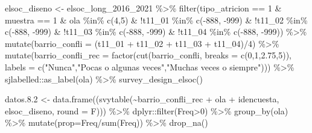 \documentclass[
  12pt,
]{book}
\newenvironment{Shaded}{\begin{snugshade}}{\end{snugshade}}
\newcommand{\AttributeTok}[1]{\textcolor[rgb]{0.77,0.63,0.00}{#1}}
\newcommand{\DecValTok}[1]{\textcolor[rgb]{0.00,0.00,0.81}{#1}}
\newcommand{\FloatTok}[1]{\textcolor[rgb]{0.00,0.00,0.81}{#1}}
\newcommand{\FunctionTok}[1]{\textcolor[rgb]{0.00,0.00,0.00}{#1}}
\newcommand{\NormalTok}[1]{#1}
\newcommand{\OtherTok}[1]{\textcolor[rgb]{0.56,0.35,0.01}{#1}}
\newcommand{\SpecialCharTok}[1]{\textcolor[rgb]{0.00,0.00,0.00}{#1}}
\newcommand{\StringTok}[1]{\textcolor[rgb]{0.31,0.60,0.02}{#1}}
\begin{document}
\begin{Shaded}
\begin{Highlighting}[]
\NormalTok{elsoc\_diseno }\OtherTok{\textless{}{-}}\NormalTok{ elsoc\_long\_2016\_2021 }\SpecialCharTok{\%\textgreater{}\%} 
  \FunctionTok{filter}\NormalTok{(tipo\_atricion }\SpecialCharTok{==} \DecValTok{1} \SpecialCharTok{\&}\NormalTok{ muestra }\SpecialCharTok{==} \DecValTok{1} \SpecialCharTok{\&}\NormalTok{ ola }\SpecialCharTok{\%in\%} \FunctionTok{c}\NormalTok{(}\DecValTok{4}\NormalTok{,}\DecValTok{5}\NormalTok{) }\SpecialCharTok{\&} \SpecialCharTok{!}\NormalTok{t11\_01 }\SpecialCharTok{\%in\%} \FunctionTok{c}\NormalTok{(}\SpecialCharTok{{-}}\DecValTok{888}\NormalTok{, }\SpecialCharTok{{-}}\DecValTok{999}\NormalTok{) }\SpecialCharTok{\&}
           \SpecialCharTok{!}\NormalTok{t11\_02 }\SpecialCharTok{\%in\%} \FunctionTok{c}\NormalTok{(}\SpecialCharTok{{-}}\DecValTok{888}\NormalTok{, }\SpecialCharTok{{-}}\DecValTok{999}\NormalTok{) }\SpecialCharTok{\&} \SpecialCharTok{!}\NormalTok{t11\_03 }\SpecialCharTok{\%in\%} \FunctionTok{c}\NormalTok{(}\SpecialCharTok{{-}}\DecValTok{888}\NormalTok{, }\SpecialCharTok{{-}}\DecValTok{999}\NormalTok{) }\SpecialCharTok{\&} \SpecialCharTok{!}\NormalTok{t11\_04 }\SpecialCharTok{\%in\%} \FunctionTok{c}\NormalTok{(}\SpecialCharTok{{-}}\DecValTok{888}\NormalTok{, }\SpecialCharTok{{-}}\DecValTok{999}\NormalTok{)) }\SpecialCharTok{\%\textgreater{}\%} 
  \FunctionTok{mutate}\NormalTok{(}\AttributeTok{barrio\_confli =}\NormalTok{ (t11\_01 }\SpecialCharTok{+}\NormalTok{ t11\_02 }\SpecialCharTok{+}\NormalTok{ t11\_03 }\SpecialCharTok{+}\NormalTok{ t11\_04)}\SpecialCharTok{/}\DecValTok{4}\NormalTok{) }\SpecialCharTok{\%\textgreater{}\%}
  \FunctionTok{mutate}\NormalTok{(}\AttributeTok{barrio\_confli\_rec =} \FunctionTok{factor}\NormalTok{(}\FunctionTok{cut}\NormalTok{(barrio\_confli, }\AttributeTok{breaks =} \FunctionTok{c}\NormalTok{(}\DecValTok{0}\NormalTok{,}\DecValTok{1}\NormalTok{,}\FloatTok{2.75}\NormalTok{,}\DecValTok{5}\NormalTok{)),}
         \AttributeTok{labels =} \FunctionTok{c}\NormalTok{(}\StringTok{"Nunca"}\NormalTok{,}\StringTok{"Pocas o algunas veces"}\NormalTok{,}\StringTok{"Muchas veces o siempre"}\NormalTok{))) }\SpecialCharTok{\%\textgreater{}\%}
\NormalTok{  sjlabelled}\SpecialCharTok{::}\FunctionTok{as\_label}\NormalTok{(ola) }\SpecialCharTok{\%\textgreater{}\%} 
  \FunctionTok{survey\_design\_elsoc}\NormalTok{()}

\NormalTok{datos.}\FloatTok{8.2} \OtherTok{\textless{}{-}} \FunctionTok{data.frame}\NormalTok{((}\FunctionTok{svytable}\NormalTok{(}\SpecialCharTok{\textasciitilde{}}\NormalTok{barrio\_confli\_rec }\SpecialCharTok{+}\NormalTok{ ola }\SpecialCharTok{+}\NormalTok{ idencuesta, elsoc\_diseno, }\AttributeTok{round =}\NormalTok{ F))) }\SpecialCharTok{\%\textgreater{}\%} 
\NormalTok{  dplyr}\SpecialCharTok{::}\FunctionTok{filter}\NormalTok{(Freq}\SpecialCharTok{\textgreater{}}\DecValTok{0}\NormalTok{)  }\SpecialCharTok{\%\textgreater{}\%} 
  \FunctionTok{group\_by}\NormalTok{(ola) }\SpecialCharTok{\%\textgreater{}\%} \FunctionTok{mutate}\NormalTok{(}\AttributeTok{prop=}\NormalTok{Freq}\SpecialCharTok{/}\FunctionTok{sum}\NormalTok{(Freq)) }\SpecialCharTok{\%\textgreater{}\%}  
  \FunctionTok{drop\_na}\NormalTok{()}


\end{Highlighting}
\end{Shaded}
\end{document}

